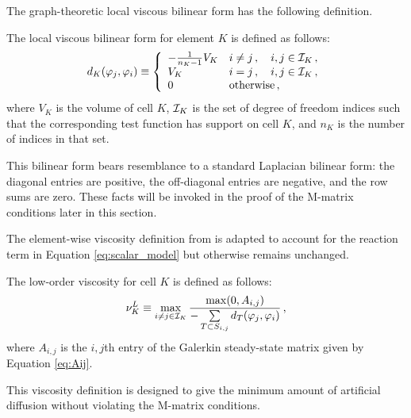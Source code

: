 The graph-theoretic local viscous bilinear form has the following definition.
\begin{defn}
   The local viscous bilinear form for element $K$ is defined as follows:
   \begin{equation}\label{eq:bilinearform}
     d_K(\varphi_j,\varphi_i) \equiv \left\{\begin{array}{l l}
       -\frac{1}{n_K - 1}V_K & i\ne j\,, \quad i,j\in \mathcal{I}_K\,, \\
       V_K                   & i = j \,, \quad i,j\in \mathcal{I}_K\,, \\
       0                     & \mbox{otherwise}\,,
     \end{array}\right.
   \end{equation}
   where $V_K$ is the volume of cell $K$, $\mathcal{I}_K$ is the set of degree
   of freedom indices such that the corresponding test function has support
   on cell $K$, and $n_K$ is the number of indices in that set.
\end{defn}
This bilinear form bears resemblance to a standard Laplacian bilinear form:
the diagonal entries are positive, the off-diagonal entries are negative, and
the row sums are zero. These facts will be invoked in the proof of the M-matrix
conditions later in this section.

The element-wise viscosity definition from \cite{guermond_firstorder} is
adapted to account for the reaction term in Equation \eqref{eq:scalar_model}
but otherwise remains unchanged.
\begin{defn}
  The low-order viscosity for cell $K$ is defined as follows:
  \begin{equation}
    \nu^L_K \equiv \max\limits_{i\ne j\in\mathcal{I}_K}
      \frac{\max(0,A_{i,j})}
      {-\sum\limits_{T\subset S_{i,j}}d_T(\varphi_j,\varphi_i)}
      \,,
  \end{equation}
  where $A_{i,j}$ is the $i,j$th entry of the Galerkin steady-state matrix
  given by Equation \eqref{eq:Aij}.
\end{defn}
This viscosity definition is designed to give the minimum amount of artificial
diffusion without violating the M-matrix conditions.

